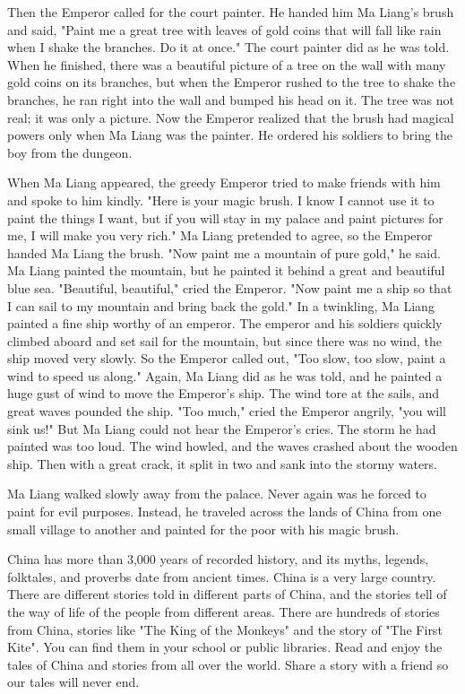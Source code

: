 Then the Emperor called for the court painter. He handed him Ma Liang's brush and said, "Paint me a great tree with leaves of gold coins that will fall like rain when I shake the branches. Do it at once." The court painter did as he was told. When he finished, there was a beautiful picture of a tree on the wall with many gold coins on its branches, but when the Emperor rushed to the tree to shake the branches, he ran right into the wall and bumped his head on it. The tree was not real; it was only a picture. Now the Emperor realized that the brush had magical powers only when Ma Liang was the painter. He ordered his soldiers to bring the boy from the dungeon.

When Ma Liang appeared, the greedy Emperor tried to make friends with him and spoke to him kindly. "Here is your magic brush. I know I cannot use it to paint the things I want, but if you will stay in my palace and paint pictures for me, I will make you very rich." Ma Liang pretended to agree, so the Emperor handed Ma Liang the brush. "Now paint me a mountain of pure gold," he said. Ma Liang painted the mountain, but he painted it behind a great and beautiful blue sea. "Beautiful, beautiful," cried the Emperor. "Now paint me a ship so that I can sail to my mountain and bring back the gold." In a twinkling, Ma Liang painted a fine ship worthy of an emperor. The emperor and his soldiers quickly climbed aboard and set sail for the mountain, but since there was no wind, the ship moved very slowly. So the Emperor called out, "Too slow, too slow, paint a wind to speed us along." Again, Ma Liang did as he was told, and he painted a huge gust of wind to move the Emperor's ship. The wind tore at the sails, and great waves pounded the ship. "Too much," cried the Emperor angrily, "you will sink us!" But Ma Liang could not hear the Emperor's cries. The storm he had painted was too loud. The wind howled, and the waves crashed about the wooden ship. Then with a great crack, it split in two and sank into the stormy waters.

Ma Liang walked slowly away from the palace. Never again was he forced to paint for evil purposes. Instead, he traveled across the lands of China from one small village to another and painted for the poor with his magic brush.

China has more than 3,000 years of recorded history, and its myths, legends, folktales, and proverbs date from ancient times. China is a very large country. There are different stories told in different parts of China, and the stories tell of the way of life of the people from different areas. There are hundreds of stories from China, stories like "The King of the Monkeys" and the story of "The First Kite". You can find them in your school or public libraries. Read and enjoy the tales of China and stories from all over the world. Share a story with a friend so our tales will never end.

